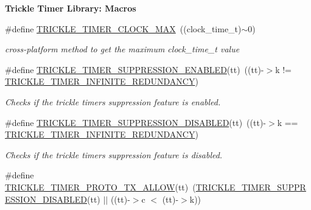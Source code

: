 \begin{Indent}{\bf Trickle Timer Library\+: Macros}\par
\begin{DoxyCompactItemize}
\item 
\hypertarget{group__trickle-timer_ga8c327f7f935dcc95d89fcbbc664fcdcf}{}\#define \hyperlink{group__trickle-timer_ga8c327f7f935dcc95d89fcbbc664fcdcf}{T\+R\+I\+C\+K\+L\+E\+\_\+\+T\+I\+M\+E\+R\+\_\+\+C\+L\+O\+C\+K\+\_\+\+M\+A\+X}~((clock\+\_\+time\+\_\+t)$\sim$0)\label{group__trickle-timer_ga8c327f7f935dcc95d89fcbbc664fcdcf}

\begin{DoxyCompactList}\small\item\em cross-\/platform method to get the maximum clock\+\_\+time\+\_\+t value \end{DoxyCompactList}\item 
\#define \hyperlink{group__trickle-timer_ga5f4e1c6f73eb9c0a18db8434d7103bd6}{T\+R\+I\+C\+K\+L\+E\+\_\+\+T\+I\+M\+E\+R\+\_\+\+S\+U\+P\+P\+R\+E\+S\+S\+I\+O\+N\+\_\+\+E\+N\+A\+B\+L\+E\+D}(tt)~((tt)-\/$>$k != \hyperlink{group__trickle-timer_ga72117b57dd1e192ca8a016055d2310f3}{T\+R\+I\+C\+K\+L\+E\+\_\+\+T\+I\+M\+E\+R\+\_\+\+I\+N\+F\+I\+N\+I\+T\+E\+\_\+\+R\+E\+D\+U\+N\+D\+A\+N\+C\+Y})
\begin{DoxyCompactList}\small\item\em Checks if the trickle timer\textquotesingle{}s suppression feature is enabled. \end{DoxyCompactList}\item 
\#define \hyperlink{group__trickle-timer_ga2c3a5dfb5c0f102b1c9755c303620004}{T\+R\+I\+C\+K\+L\+E\+\_\+\+T\+I\+M\+E\+R\+\_\+\+S\+U\+P\+P\+R\+E\+S\+S\+I\+O\+N\+\_\+\+D\+I\+S\+A\+B\+L\+E\+D}(tt)~((tt)-\/$>$k == \hyperlink{group__trickle-timer_ga72117b57dd1e192ca8a016055d2310f3}{T\+R\+I\+C\+K\+L\+E\+\_\+\+T\+I\+M\+E\+R\+\_\+\+I\+N\+F\+I\+N\+I\+T\+E\+\_\+\+R\+E\+D\+U\+N\+D\+A\+N\+C\+Y})
\begin{DoxyCompactList}\small\item\em Checks if the trickle timer\textquotesingle{}s suppression feature is disabled. \end{DoxyCompactList}\item 
\#define \hyperlink{group__trickle-timer_ga2b39325309fb89efa3b965437a249bef}{T\+R\+I\+C\+K\+L\+E\+\_\+\+T\+I\+M\+E\+R\+\_\+\+P\+R\+O\+T\+O\+\_\+\+T\+X\+\_\+\+A\+L\+L\+O\+W}(tt)~(\hyperlink{group__trickle-timer_ga2c3a5dfb5c0f102b1c9755c303620004}{T\+R\+I\+C\+K\+L\+E\+\_\+\+T\+I\+M\+E\+R\+\_\+\+S\+U\+P\+P\+R\+E\+S\+S\+I\+O\+N\+\_\+\+D\+I\+S\+A\+B\+L\+E\+D}(tt) $\vert$$\vert$ ((tt)-\/$>$c $<$ (tt)-\/$>$k))
$$
\end{DoxyCompactItemize}
\end{Indent}
